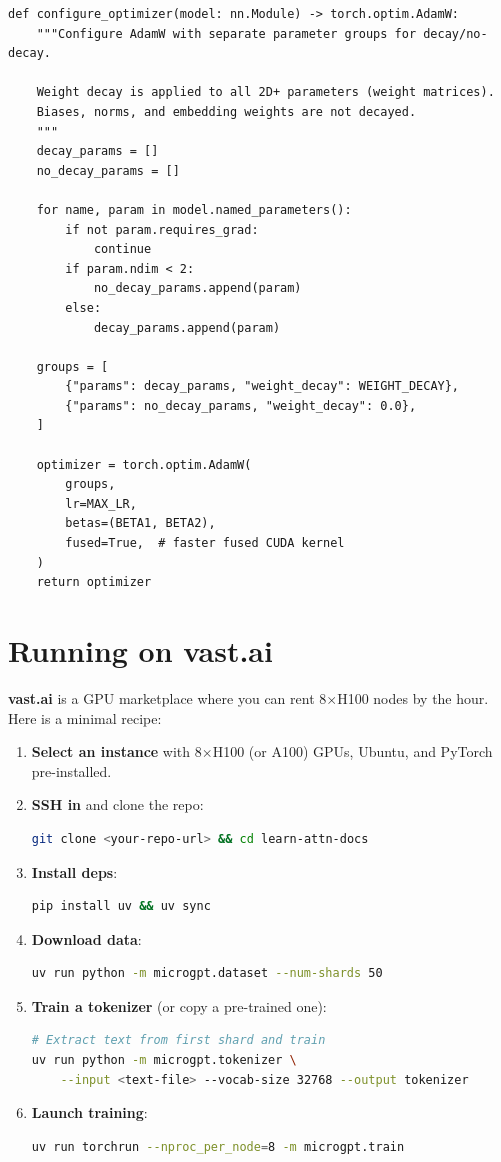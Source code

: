 \begin{lstlisting}
def configure_optimizer(model: nn.Module) -> torch.optim.AdamW:
    """Configure AdamW with separate parameter groups for decay/no-decay.

    Weight decay is applied to all 2D+ parameters (weight matrices).
    Biases, norms, and embedding weights are not decayed.
    """
    decay_params = []
    no_decay_params = []

    for name, param in model.named_parameters():
        if not param.requires_grad:
            continue
        if param.ndim < 2:
            no_decay_params.append(param)
        else:
            decay_params.append(param)

    groups = [
        {"params": decay_params, "weight_decay": WEIGHT_DECAY},
        {"params": no_decay_params, "weight_decay": 0.0},
    ]

    optimizer = torch.optim.AdamW(
        groups,
        lr=MAX_LR,
        betas=(BETA1, BETA2),
        fused=True,  # faster fused CUDA kernel
    )
    return optimizer
\end{lstlisting}


\section{Running on vast.ai}

\textbf{vast.ai} is a GPU marketplace where you can rent 8$\times$H100 nodes by the hour.  Here is a minimal recipe:

\begin{enumerate}
  \item \textbf{Select an instance} with 8$\times$H100 (or A100) GPUs, Ubuntu, and PyTorch pre-installed.
  \item \textbf{SSH in} and clone the repo:
  \begin{lstlisting}[language=bash]
git clone <your-repo-url> && cd learn-attn-docs
  \end{lstlisting}
  \item \textbf{Install deps}:
  \begin{lstlisting}[language=bash]
pip install uv && uv sync
  \end{lstlisting}
  \item \textbf{Download data}:
  \begin{lstlisting}[language=bash]
uv run python -m microgpt.dataset --num-shards 50
  \end{lstlisting}
  \item \textbf{Train a tokenizer} (or copy a pre-trained one):
  \begin{lstlisting}[language=bash]
# Extract text from first shard and train
uv run python -m microgpt.tokenizer \
    --input <text-file> --vocab-size 32768 --output tokenizer
  \end{lstlisting}
  \item \textbf{Launch training}:
  \begin{lstlisting}[language=bash]
uv run torchrun --nproc_per_node=8 -m microgpt.train
  \end{lstlisting}
\end{enumerate}

